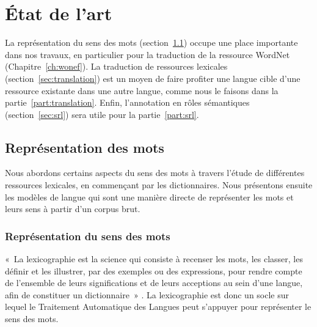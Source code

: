 

\chapter{État de l'art} 
\label{ch:etatdelart} 

La représentation du sens des mots (section~\ref{sec:mots}) occupe une place
importante dans nos travaux, en particulier pour la traduction de la ressource
WordNet (Chapitre~\ref{ch:wonef}). La traduction de ressources lexicales
(section~\ref{sec:translation}) est un moyen de faire profiter une langue cible
d'une ressource existante dans une autre langue, comme nous le faisons dans la
partie~\ref{part:translation}. Enfin, l'annotation en rôles sémantiques
(section~\ref{sec:srl}) sera utile pour la partie~\ref{part:srl}.

\section{Représentation des mots}
\label{sec:mots}

Nous abordons certains aspects du sens des mots à travers l'étude de
différentes ressources lexicales, en commençant par les dictionnaires. Nous
présentons ensuite les modèles de langue qui sont une manière directe de
représenter les mots et leurs sens à partir d'un corpus brut.

\subsection{Représentation du sens des mots}
\label{subsec:sens_mots}

«~La lexicographie est la science qui consiste à recenser les mots, les
classer, les définir et les illustrer, par des exemples ou des expressions,
pour rendre compte de l'ensemble de leurs significations et de leurs acceptions
au sein d'une langue, afin de constituer un dictionnaire~»
\citep{wikipedia2014lexicographie}. La lexicographie est donc un socle sur
lequel le Traitement Automatique des Langues peut s'appuyer pour représenter le
sens des mots.

